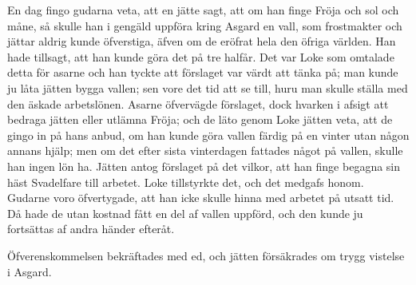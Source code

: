 En dag fingo gudarna veta, att en jätte sagt, att om han finge Fröja och
sol och måne, så skulle han i gengäld uppföra kring Asgard en vall, som
frostmakter och jättar aldrig kunde öfverstiga, äfven om de eröfrat hela
den öfriga världen. Han hade tillsagt, att han kunde göra det på tre
halfår. Det var Loke som omtalade detta för asarne och han tyckte att
förslaget var värdt att tänka på; man kunde ju låta jätten bygga vallen;
sen vore det tid att se till, huru man skulle ställa med den äskade
arbetslönen. Asarne öfvervägde förslaget, dock hvarken i afsigt att
bedraga jätten eller utlämna Fröja; och de läto genom Loke jätten veta,
att de gingo in på hans anbud, om han kunde göra vallen färdig på en
vinter utan någon annans hjälp; men om det efter sista vinterdagen
fattades något på vallen, skulle han ingen lön ha. Jätten antog
förslaget på det vilkor, att han finge begagna sin häst Svadelfare till
arbetet. Loke tillstyrkte det, och det medgafs honom. Gudarne voro
öfvertygade, att han icke skulle hinna med arbetet på utsatt tid. Då
hade de utan kostnad fått en del af vallen uppförd, och den kunde ju
fortsättas af andra händer efteråt.

Öfverenskommelsen bekräftades med ed, och jätten försäkrades om trygg
vistelse i Asgard.

